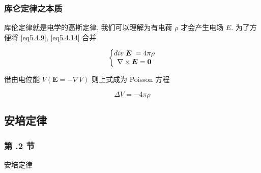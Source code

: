 \documentclass[aspectratio=2516]{beamer}
\begin{document}


\begin{frame}
\frametitle{\kaishu 库仑定律之本质}

\kaishu

库伦定律就是电学的高斯定律, 我们可以理解为有电荷 $ \rho $ 才会产生电场 $ E $. 为了方便将 \ref{eq5.4.9}, \ref{eq5.4.14} 合并

\begin{equation}
\left\{ {\begin{matrix}
	{div\;\boldsymbol{E}\; = 4\pi \rho }  \\ 
	{\nabla  \times \boldsymbol{E} = \boldsymbol{0}}  \\ 
	\end{matrix}} \right.
\notag 
\end{equation}

借由电位能 $ V(\boldsymbol{E} = - \nabla V) $ 则上式成为 Poisson 方程

\begin{equation}
\Delta V =  - 4\pi \rho 
\label{eq5.4.15}
\end{equation}

\end{frame}



\subsection{\kaishu 安培定律}


\begin{frame}
\frametitle{ \kaishu 第 \uppercase\expandafter{}.2 节 }
\begin{center}
	\Large \kaishu  安培定律
\end{center}
\end{frame}
\end{document}
